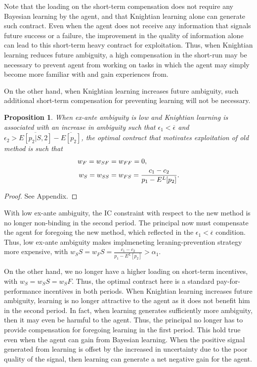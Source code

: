 \documentclass[11pt]{article} %
\theoremstyle{exampstyle}
\newtheorem{proposition}{Proposition}
\newcommand{\eq}[1]{\begin{align}#1\end{align}}
\begin{document}
Note that the loading on the short-term compensation does not require any Bayesian learning by the agent, and that Knightian learning alone can generate such contract. Even when the agent does not receive any information that signals future success or a failure, the improvement in the quality of information alone can lead to this short-term heavy contract for exploitation. Thus, when Knightian learning reduces future ambiguity, a high compensation in the short-run may be necessary to prevent agent from working on tasks in which the agent may simply become more familiar with and gain experiences from. 

On the other hand, when Knightian learning increases future ambiguity, such additional short-term compensation for preventing learning will not be necessary. 
\begin{proposition}
\label{exploitation2}
When ex-ante ambiguity is low and Knightian learning is associated with an increase in ambiguity such that $\epsilon_1 <\overline{\epsilon}$ and $\epsilon_2 > \overline{E[p_2|S,2]} -\overline{E[p_2]}$, the optimal contract that motivates exploitation of old method is such that
%
\eq{ 
 w_F=w_{SF}&=w_{FF} =0 , \notag \\
 w_S = w_{SS}&=w_{FS}= \frac{c_1-c_2}{p_1-E^L[p_2]}.  \notag
}

\end{proposition}

\begin{proof}
See Appendix.
\end{proof}

With low ex-ante ambiguity, the IC constraint with respect to the new method is no longer non-binding in the second period. The principal now must compensate the agent for foregoing the new method, which reflected in the $\epsilon_1 <\overline{\epsilon}$ condition. Thus, low ex-ante ambiguity makes implmeneting leraning-prevention strategy more expensive, with $w_SS = w_FS = \frac{c_1-c_2}{p_1-E^L[p_2]} > \alpha_1$. 

On the other hand, we no longer have a higher loading on short-term incentives, with $w_S = w_SS = w_SF$. Thus, the optimal contract here is a standard pay-for-performance incentives in both periods. When Knightian learning increases future ambiguity, learning is no longer attractive to the agent as it does not benefit him in the second period. In fact, when learning generates sufficiently more ambiguity, then it may even be harmful to the agent. Thus, the principal no longer has to provide compensation for foregoing learning in the first period. This hold true even when the agent can gain from Bayesian learning. When the positive signal generated from learning is offset by the increased in uncertainty due to the poor quality of the signal, then learning can generate a net negative gain for the agent. 
\end{document}
